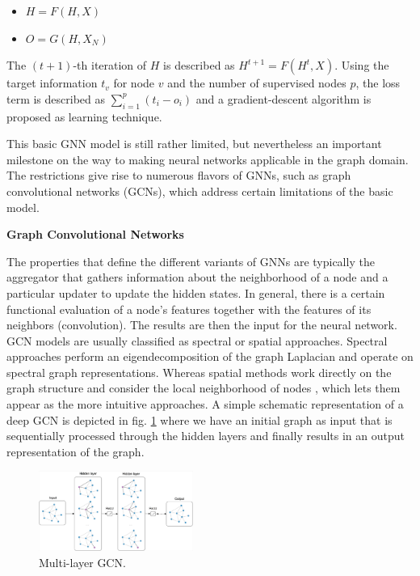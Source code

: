 \documentclass[a4paper,preprint]{sig-alternate}
\begin{document}
\begin{itemize}
    \item $H = F(H, X)$
    \item $O = G(H, X_N)$
\end{itemize}

The $(t + 1)$-th iteration of $H$ is described as $H^{t + 1} = F(H^t, X)$.
Using the target information $t_v$ for node $v$ and the number of supervised nodes $p$, 
the loss term is described as $\sum_{i=1}^p (t_i - o_i)$ and a gradient-descent algorithm is proposed as learning technique.\newline

\vfill
\pagebreak

This basic GNN model is still rather limited, but nevertheless an important milestone on the way to making
neural networks applicable in the graph domain. \cite{Liu_2020}
The restrictions give rise to numerous flavors of GNNs, such as graph convolutional networks (GCNs),
which address certain limitations of the basic model.\newline

\textbf{Graph Convolutional Networks}\newline

The properties that define the different variants of GNNs are typically the aggregator that gathers 
information about the neighborhood of a node and a particular updater to update the hidden states. \cite{Zhou_2019}
In general, there is a certain functional evaluation of a node's features together with the features of its neighbors (convolution). 
The results are then the input for the neural network. GCN models are usually classified as spectral or spatial approaches.
Spectral approaches perform an eigendecomposition of the graph Laplacian and operate on spectral graph representations. \cite{Zhou_2019}
Whereas spatial methods work directly on the graph structure and consider the local neighborhood of nodes \cite{Zhou_2019},
which lets them appear as the more intuitive approaches.
A simple schematic representation of a deep GCN is depicted in fig. \ref{fig:gcn} where we have an initial graph as input
that is sequentially processed through the hidden layers and finally results in an output representation of the graph.
\begin{figure}[h]
    \centering
    \includegraphics[width=0.45\textwidth]{img/gcn.png}
    \caption{Multi-layer GCN. \cite{Kipf_2016}}
    \label{fig:gcn}
\end{figure}
\end{document}
